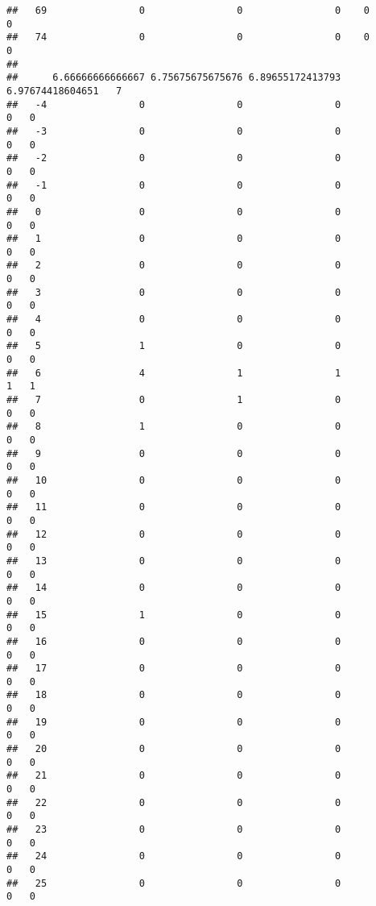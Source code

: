 \documentclass[]{article}
\begin{document}
\begin{verbatim}
##   69                0                0                0    0                0
##   74                0                0                0    0                0
##     
##      6.66666666666667 6.75675675675676 6.89655172413793 6.97674418604651   7
##   -4                0                0                0                0   0
##   -3                0                0                0                0   0
##   -2                0                0                0                0   0
##   -1                0                0                0                0   0
##   0                 0                0                0                0   0
##   1                 0                0                0                0   0
##   2                 0                0                0                0   0
##   3                 0                0                0                0   0
##   4                 0                0                0                0   0
##   5                 1                0                0                0   0
##   6                 4                1                1                1   1
##   7                 0                1                0                0   0
##   8                 1                0                0                0   0
##   9                 0                0                0                0   0
##   10                0                0                0                0   0
##   11                0                0                0                0   0
##   12                0                0                0                0   0
##   13                0                0                0                0   0
##   14                0                0                0                0   0
##   15                1                0                0                0   0
##   16                0                0                0                0   0
##   17                0                0                0                0   0
##   18                0                0                0                0   0
##   19                0                0                0                0   0
##   20                0                0                0                0   0
##   21                0                0                0                0   0
##   22                0                0                0                0   0
##   23                0                0                0                0   0
##   24                0                0                0                0   0
##   25                0                0                0                0   0

\end{verbatim}
\end{document}
